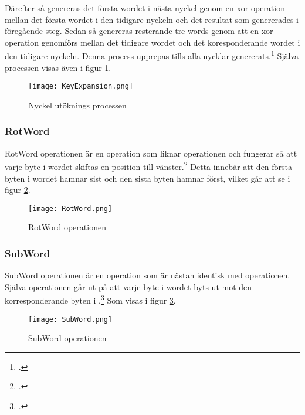 Därefter så genereras det första wordet i nästa nyckel genom en \gls{xor}-operation mellan det första wordet i den tidigare nyckeln och det resultat som genererades i föregående steg.
Sedan så genereras resterande tre words genom att en \gls{xor}-operation genomförs mellan det tidigare wordet och det koresponderande wordet i den tidigare nyckeln.
Denna process upprepas tills alla nycklar genererats.\footcite{daemen1999aes} Själva processen visas även i figur \ref{fig:aes-key-expansion-pic}.

\begin{figure}[H]
    \centering
    \texttt{[image: KeyExpansion.png]}
    \caption{Nyckel utöknings processen}
    \label{fig:aes-key-expansion-pic}
\end{figure}

\subsubsection{RotWord}
\label{sec:aes-rotword}

RotWord operationen är en operation som liknar  operationen och fungerar så att varje \gls{byte} i wordet skiftas en position till vänster.\footcite{daemen1999aes}
Detta innebär att den första \gls{byte}n i wordet hamnar sist och den sista \gls{byte}n hamnar först, vilket går att se i figur \ref{fig:aes-rotword-pic}.

\begin{figure}[H]
    \centering
    \texttt{[image: RotWord.png]}
    \caption{RotWord operationen}
    \label{fig:aes-rotword-pic}
\end{figure}

\subsubsection{SubWord}
\label{sec:aes-subword}

SubWord operationen är en operation som är nästan identisk med  operationen. Själva operationen går ut på att varje \gls{byte} i wordet byts ut mot den korresponderande \gls{byte}n i .\footcite{daemen1999aes}
Som visas i figur \ref{fig:aes-subword-pic}.

\begin{figure}[H]
    \centering
    \texttt{[image: SubWord.png]}
    \caption{SubWord operationen}
    \label{fig:aes-subword-pic}
\end{figure}

